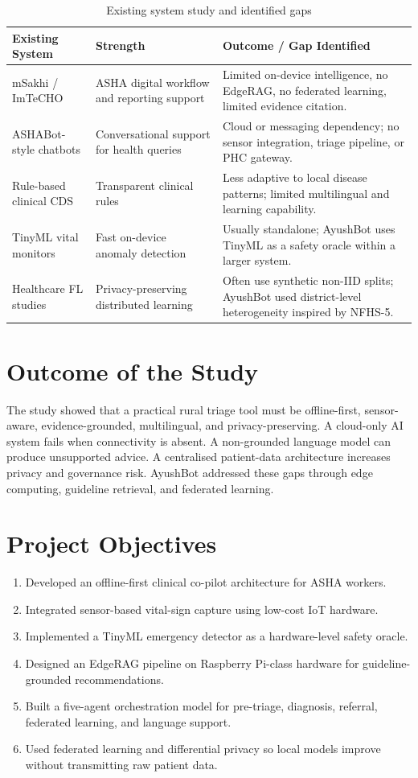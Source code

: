 \documentclass[12pt,a4paper,openany]{report}
\begin{document}
\begin{table}[!htbp]
\centering
\caption{Existing system study and identified gaps}
\begin{tabularx}{\textwidth}{p{}X X}
\toprule
\textbf{Existing System} & \textbf{Strength} & \textbf{Outcome / Gap Identified}\\
\midrule
mSakhi / ImTeCHO & ASHA digital workflow and reporting support & Limited on-device intelligence, no EdgeRAG, no federated learning, limited evidence citation.\\
ASHABot-style chatbots & Conversational support for health queries & Cloud or messaging dependency; no sensor integration, triage pipeline, or PHC gateway.\\
Rule-based clinical CDS & Transparent clinical rules & Less adaptive to local disease patterns; limited multilingual and learning capability.\\
TinyML vital monitors & Fast on-device anomaly detection & Usually standalone; AyushBot uses TinyML as a safety oracle within a larger system.\\
Healthcare FL studies & Privacy-preserving distributed learning & Often use synthetic non-IID splits; AyushBot used district-level heterogeneity inspired by NFHS-5.\\
\bottomrule
\end{tabularx}
\end{table}

\section{Outcome of the Study}
The study showed that a practical rural triage tool must be offline-first, sensor-aware, evidence-grounded, multilingual, and privacy-preserving. A cloud-only AI system fails when connectivity is absent. A non-grounded language model can produce unsupported advice. A centralised patient-data architecture increases privacy and governance risk. AyushBot addressed these gaps through edge computing, guideline retrieval, and federated learning.

\section{Project Objectives}
\begin{enumerate}
  \item Developed an offline-first clinical co-pilot architecture for ASHA workers.
  \item Integrated sensor-based vital-sign capture using low-cost IoT hardware.
  \item Implemented a TinyML emergency detector as a hardware-level safety oracle.
  \item Designed an EdgeRAG pipeline on Raspberry Pi-class hardware for guideline-grounded recommendations.
  \item Built a five-agent orchestration model for pre-triage, diagnosis, referral, federated learning, and language support.
  \item Used federated learning and differential privacy so local models improve without transmitting raw patient data.
\end{enumerate}
\end{document}

